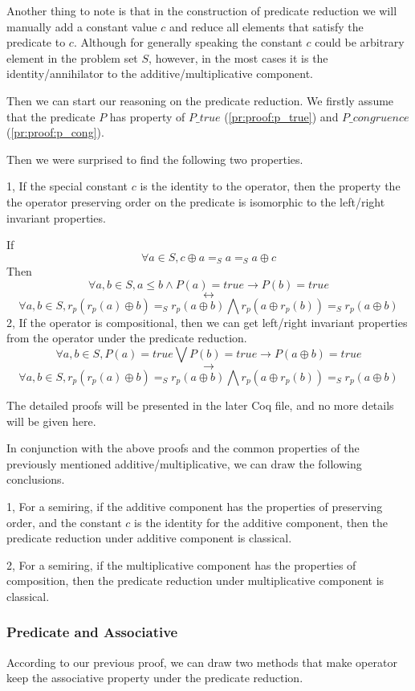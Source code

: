 \documentclass[a4paper,12pt,twoside,openright]{report}
\begin{document}
Another thing to note is that in the construction of predicate reduction we will manually add a constant value $c$ and reduce all elements that satisfy the predicate to $c$.
Although for generally speaking the constant $c$ could be arbitrary element in the problem set $S$, however, in the most cases it is the identity/annihilator to the additive/multiplicative component.

Then we can start our reasoning on the predicate reduction. We firstly assume that the predicate $P$ has property of $P\_true$ (\ref{pr:proof:p_true}) and $P\_congruence$ (\ref{pr:proof:p_cong}). 

Then we were surprised to find the following two properties.

1, If the special constant $c$ is the identity to the operator, then the property the the operator preserving order on the predicate is isomorphic to the left/right invariant properties.

If \[\forall a \in S, c \oplus a =_S a =_S a \oplus c\]
Then
\[\forall a,b \in S, a \leq b \wedge P(a) = true \rightarrow P(b) = true\]
\[\longleftrightarrow\]
\[\forall a,b \in S, r_p(r_p(a) \oplus b) =_S r_p(a \oplus b) \bigwedge r_p(a \oplus r_p(b)) =_S r_p(a \oplus b)\]
2, If the operator is compositional, then we can get left/right invariant properties from the operator under the predicate reduction.
\[\forall a,b \in S, P(a) = true \bigvee P (b) = true \rightarrow P(a \oplus b)= true\]
\[\longrightarrow\]
\[\forall a,b \in S, r_p(r_p(a) \oplus b) =_S r_p(a \oplus b) \bigwedge r_p(a \oplus r_p(b)) =_S r_p(a \oplus b)\]

The detailed proofs will be presented in the later Coq file, and no more details will be given here.

In conjunction with the above proofs and the common properties of the previously mentioned additive/multiplicative, we can draw the following conclusions.

1, For a semiring, if the additive component has the properties of preserving order, and the constant $c$ is the identity for the additive component, then the predicate reduction under additive component is classical.

2, For a semiring, if the multiplicative component has the properties of composition, then the predicate reduction under multiplicative component is classical.
\subsubsection{Predicate and Associative}
According to our previous proof, we can draw two methods that make operator keep the associative property under the predicate reduction.
\end{document}
